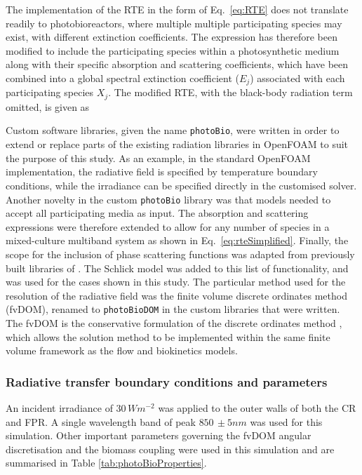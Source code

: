 The implementation of the RTE in the form of Eq.\ \ref{eq:RTE} does not translate readily to photobioreactors, where multiple multiple participating species may exist, with different extinction coefficients. The expression has therefore been modified to include the participating species within a photosynthetic medium along with their specific absorption and scattering coefficients, which have been combined into a global spectral extinction coefficient ($E_j$) associated with each participating species $X_j$. The modified RTE, with the black-body radiation term omitted, is given as



Custom software libraries, given the name \texttt{photoBio}, were written in order to extend or replace parts of the existing radiation libraries in OpenFOAM to suit the purpose of this study. As an example, in the standard OpenFOAM implementation, the radiative field is specified by temperature boundary conditions, while the irradiance can be specified directly in the customised solver.  Another novelty in the custom \texttt{photoBio} library was that models needed to accept all participating media as input. The absorption and scattering expressions were therefore extended to allow for any number of species in a mixed-culture multiband system as shown in Eq.\ \ref{eq:rteSimplified}. Finally, the scope for the inclusion of phase scattering functions was adapted from previously built libraries of \cite{Kong2014}. The Schlick model was added to this list of functionality, and was used for the cases shown in this study.
\skippingparagraph
The particular method used for the resolution of the radiative field was the finite volume discrete ordinates method (fvDOM), renamed to \texttt{photoBioDOM} in the custom libraries that were written. The fvDOM is the conservative formulation of the discrete ordinates method \cite{Raithby1990}, which allows the solution method to be implemented within the same finite volume framework as the flow and biokinetics models.


\subsubsection{Radiative transfer boundary conditions and parameters}

An incident irradiance of $30\, Wm^{-2}$ was applied to the outer walls of both the CR and FPR. A single wavelength band of peak $850\, \pm 5 nm$ was used for this simulation. Other important parameters governing the fvDOM angular discretisation and the biomass coupling were used in this simulation and are summarised in Table \ref{tab:photoBioProperties}.

